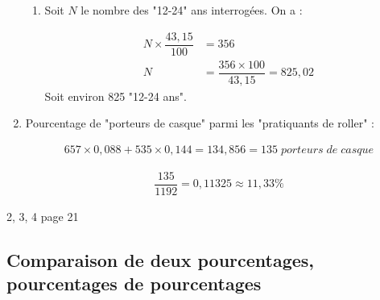 \documentclass[12pt,a4paper]{article}
\begin{document}
\begin{enumerate}[label=\arabic*.]
\begin{enumerate}[label=\alph*) ]
		
		\item Soit $N$ le nombre des "12-24" ans interrogées. On a :
		
		\begin{eqnarray*}
			N \times \dfrac{43,15}{100} &= 356 \\
			N &= \dfrac{356 \times 100}{43,15} = 825,02
		\end{eqnarray*}
		Soit environ 825 "12-24 ans".
	\end{enumerate}
	
	\item Pourcentage de "porteurs de casque" parmi les "pratiquants de roller" :
	
	\begin{eqnarray*}
		657 \times 0,088 + 535 \times 0,144 = 134,856 = 135\; porteurs\; de\; casque
	\end{eqnarray*}
	
	\begin{eqnarray*}
		\dfrac{135}{1192}=0,11325 \approx 11,33 \%
	\end{eqnarray*}
\end{enumerate}



\begin{myexos}
	2, 3, 4 page 21
\end{myexos}

\subsection{Comparaison de deux pourcentages, pourcentages de pourcentages}
\end{document}
